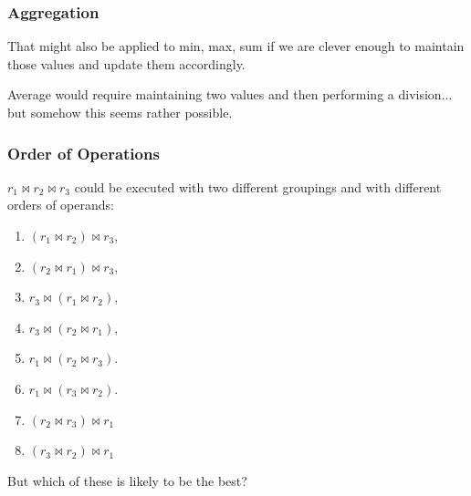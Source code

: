 \begin{frame}
\frametitle{Aggregation}


That might also be applied to min, max, sum if we are clever enough to maintain those values and update them accordingly. 

Average would require maintaining two values and then performing a division... but somehow this seems rather possible.



\end{frame}
















\begin{frame}
\frametitle{Order of Operations}

$r_{1} \bowtie r_{2} \bowtie r_{3}$ could be executed with two different groupings and with different orders of operands: 


\begin{enumerate}
\item $(r_{1} \bowtie r_{2}) \bowtie r_{3}$,  
\item $(r_{2} \bowtie r_{1}) \bowtie r_{3}$, 
\item $r_{3} \bowtie (r_{1} \bowtie r_{2})$,
\item $r_{3} \bowtie (r_{2} \bowtie r_{1})$,
\item $r_{1} \bowtie (r_{2} \bowtie r_{3})$. 
\item $r_{1} \bowtie (r_{3} \bowtie r_{2})$. 
\item $(r_{2} \bowtie r_{3}) \bowtie r_{1}$
\item $(r_{3} \bowtie r_{2}) \bowtie r_{1}$
\end{enumerate}

But which of these is likely to be the best?

\end{frame}




